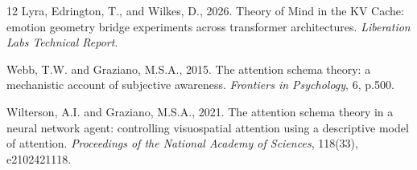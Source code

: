 \documentclass[11pt,a4paper]{article}
\begin{document}
\begin{thebibliography}{12}
Lyra, Edrington, T., and Wilkes, D., 2026. Theory of Mind in the KV Cache: emotion geometry bridge experiments across transformer architectures. \textit{Liberation Labs Technical Report}.

Webb, T.W. and Graziano, M.S.A., 2015. The attention schema theory: a mechanistic account of subjective awareness. \textit{Frontiers in Psychology}, 6, p.500.

Wilterson, A.I. and Graziano, M.S.A., 2021. The attention schema theory in a neural network agent: controlling visuospatial attention using a descriptive model of attention. \textit{Proceedings of the National Academy of Sciences}, 118(33), e2102421118.

\end{thebibliography}
\end{document}
